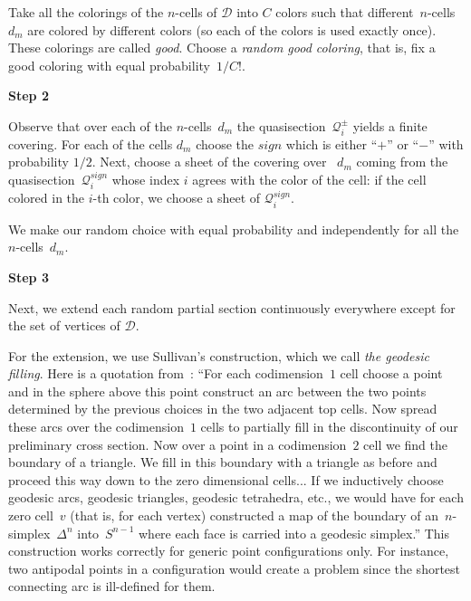 \documentclass[12pt]{amsart}
\theoremstyle{plain}
\theoremstyle{definition}
\theoremstyle{plain}
\theoremstyle{definition}
\begin{document}
Take all the colorings of the $n$-cells of $\mathcal{D}$ into $C$ colors such that different~$n$-cells $d_m$ are colored by different colors (so each of the colors 
is used exactly once). These colorings are called \textit{good}.  Choose a  \textit{random good coloring}, that is, fix a good coloring with equal probability~$1/C!$.



\medskip

\textbf{Step 2}

 Observe that over each of the $n$-cells~$d_m$ the quasisection~$\mathcal{Q}_i^{\pm}$ yields  a finite  covering. For each of the cells $d_m$ choose the $sign$ which is either ``$+$'' or ``$-$'' with probability $1/2$. Next, 
 { choose  a sheet of the covering over ~$d_m$} coming from the quasisection~$\mathcal{Q}^{sign}_i$ whose index $i$ agrees with the color of the cell: {if the cell colored in the $i$-th color, we choose a sheet of $\mathcal{Q}_i^{sign}$.}
 
 We make our random choice
 with equal probability and independently for all the $n$-cells~$d_m$. 
 
\medskip

\textbf{Step 3}

   Next,  we extend each random partial section continuously everywhere except for the set of vertices of $\mathcal{D}$. 
   
   



  
  
 
    
 For the extension, we use Sullivan's construction, which we call \textit{the geodesic filling}. Here is a quotation from~\cite{Sullivan}:
    ``For each codimension~$1$ cell choose a point and in the sphere above this point construct an arc between the two points  determined by the previous choices in the two adjacent top cells. Now spread these arcs over the codimension~$1$ cells to partially fill in the discontinuity of our preliminary cross section. Now over a point in a codimension~$2$ cell we find the boundary of a triangle. We fill in this boundary with a triangle as before and
    proceed this way down to the zero dimensional cells... If we inductively choose geodesic arcs, geodesic triangles, geodesic tetrahedra, etc., we would have for each zero cell~$v$ (that is, for each vertex) constructed a map of the boundary of an~$n$-simplex~$\Delta^n$  into~$S^{n-1}$ where each face is carried into 
    a geodesic simplex.''
    This construction works correctly for generic point configurations only. For instance, two antipodal points in a configuration would create a problem since the shortest connecting arc is ill-defined for them.
    
\end{document}
